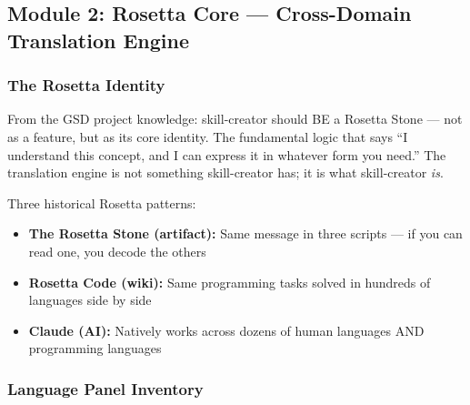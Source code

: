 \documentclass[11pt,letterpaper]{article}
\begin{document}
\subsection{Module 2: Rosetta Core --- Cross-Domain Translation Engine}

\subsubsection{The Rosetta Identity}

From the GSD project knowledge: skill-creator should BE a Rosetta Stone --- not as a feature, but as its core identity. The fundamental logic that says ``I understand this concept, and I can express it in whatever form you need.'' The translation engine is not something skill-creator has; it is what skill-creator \textit{is}.

Three historical Rosetta patterns:
\begin{itemize}[leftmargin=1.5em]
  \item \textbf{The Rosetta Stone (artifact):} Same message in three scripts --- if you can read one, you decode the others
  \item \textbf{Rosetta Code (wiki):} Same programming tasks solved in hundreds of languages side by side
  \item \textbf{Claude (AI):} Natively works across dozens of human languages AND programming languages
\end{itemize}

\subsubsection{Language Panel Inventory}
\end{document}
